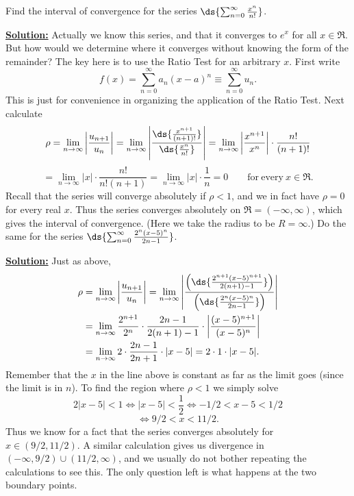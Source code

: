 \bex
Find the interval of
convergence for the series $\ds{\sum_{n=0}^\infty \frac{x^n}{n!}}$.
\medskip

\underline{\bf Solution:} Actually we know this series, and that
it converges to $e^x$ for all $x\in\Re$.  But how would we determine
where it converges without knowing the form of the remainder?
The key here is to use the Ratio Test for an arbitrary $x$. 
First write
$$f(x)=\sum_{n=0}^\infty a_n(x-a)^n\equiv\sum_{n=0}^\infty u_n.$$
This is just for convenience in organizing the application of the
Ratio Test. Next calculate 
$$\rho=\lim_{n\to\infty}\left|\frac{u_{n+1}}{u_n}\right|
=\lim_{n\to\infty}\left|\frac{\ds{\frac{x^{n+1}}{(n+1)!}}}
{\ds{\frac{x^n}{n!}}}\right|
=\lim_{n\to\infty}\left|\frac{x^{n+1}}{x^n}\right|\cdot\frac{n!}{(n+1)!}$$ 
$$=\lim_{n\to\infty}|x|\cdot\frac{n!}{n!(n+1)}=\lim_{n\to\infty}|x|
\cdot\frac1n=0\qquad\mathrm{for\ every\ }x\in\Re.$$ 
Recall that the series will converge absolutely if $\rho<1$, and
we in fact have $\rho=0$ for every real $x$.  Thus the series converges
absolutely on $\Re=(-\infty,\infty)$, which gives the interval of
convergence.  (Here we take the radius to be $R=\infty$.) 
\eex
\bex
Do the same for the
series $\ds{\sum_{n=0}^\infty\frac{2^n(x-5)^n}{2n-1}}$.

\medskip\underline{\bf Solution:} Just as above,
\begin{align*}
\rho&=\lim_{n\to\infty}\left|\frac{u_{n+1}}{u_n}\right|
=\lim_{n\to\infty}\left|\frac{\left( 
\ds{\frac{2^{n+1}(x-5)^{n+1}}{2(n+1)-1}}
\right)}{\left( 
\ds{\frac{2^n(x-5)^n}{2n-1}}\right)}\right|
\\
&=\lim_{n\to\infty}\frac{2^{n+1}}{2^n}\cdot\frac{2n-1}{2(n+1)-1} 
\cdot
\left|\frac{(x-5)^{n+1}}{(x-5)^n}\right| \\
&=\lim_{n\to\infty}2\cdot\frac{2n-1}{2n+1}\cdot|x-5|=2\cdot1\cdot|x-5|.
\end{align*} 
Remember that the $x$ in the line above is constant as far as the
limit goes (since the limit is in $n$).
To find the region where $\rho<1$ we simply solve
$$2|x-5|<1 \iff |x-5|<\frac12
\iff -1/2< x-5< 1/2$$
$$\iff 9/2<x<11/2.$$
Thus we know for a fact that the series converges absolutely for
$x\in(9/2,11/2).$
A similar calculation gives us divergence in $(-\infty,9/2)\cup
(11/2,\infty)$, and we usually do not bother repeating the calculations
to see this.  The only question left is what happens at the two 
boundary points.


